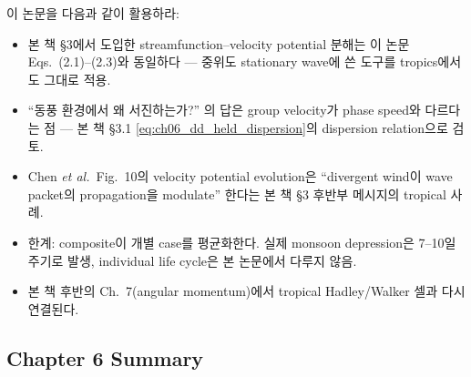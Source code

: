 \begin{hisublock}
이 논문을 다음과 같이 활용하라:
\begin{itemize}
  \item 본 책 \S3에서 도입한 streamfunction--velocity potential 분해는
        이 논문 Eqs.~(2.1)--(2.3)와 동일하다 ---
        중위도 stationary wave에 쓴 도구를 tropics에서도 그대로 적용.
  \item ``동풍 환경에서 왜 서진하는가?'' 의 답은 group velocity가
        phase speed와 다르다는 점 --- 본 책 \S3.1
        \eqref{eq:ch06_dd_held_dispersion}의 dispersion relation으로 검토.
  \item Chen \emph{et al.}\ Fig.~10의 velocity potential evolution은
        ``divergent wind이 wave packet의 propagation을 modulate''
        한다는 본 책 \S3 후반부 메시지의 tropical 사례.
  \item 한계: composite이 개별 case를 평균화한다. 실제 monsoon depression은
        7--10일 주기로 발생, individual life cycle은 본 논문에서 다루지 않음.
  \item 본 책 후반의 Ch.~7(angular momentum)에서 tropical Hadley/Walker 셀과
        다시 연결된다.
\end{itemize}
\end{hisublock}



\subsection*{Chapter 6 Summary}

